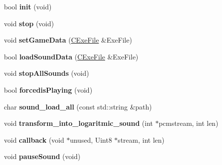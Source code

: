\begin{DoxyCompactItemize}
\item 
\hypertarget{class_c_sound_a369857e8cf384e176162fa31aa8e9bca}{
bool {\bfseries init} (void)}
\label{class_c_sound_a369857e8cf384e176162fa31aa8e9bca}

\item 
\hypertarget{class_c_sound_aed9247519d02d450fb96bf4e79b4dcc3}{
void {\bfseries stop} (void)}
\label{class_c_sound_aed9247519d02d450fb96bf4e79b4dcc3}

\item 
\hypertarget{class_c_sound_aa3cd2eaef3688d9ebc891db8075fbcc4}{
void {\bfseries setGameData} (\hyperlink{class_c_exe_file}{CExeFile} \&ExeFile)}
\label{class_c_sound_aa3cd2eaef3688d9ebc891db8075fbcc4}

\item 
\hypertarget{class_c_sound_a84130ee3c53309db4393845b75182708}{
bool {\bfseries loadSoundData} (\hyperlink{class_c_exe_file}{CExeFile} \&ExeFile)}
\label{class_c_sound_a84130ee3c53309db4393845b75182708}

\item 
\hypertarget{class_c_sound_a8ddf763f8ebfd19e2a95e2994a269e77}{
void {\bfseries stopAllSounds} (void)}
\label{class_c_sound_a8ddf763f8ebfd19e2a95e2994a269e77}

\item 
\hypertarget{class_c_sound_ab522837d2ed51dda2c0f23b5b6edab5d}{
bool {\bfseries forcedisPlaying} (void)}
\label{class_c_sound_ab522837d2ed51dda2c0f23b5b6edab5d}

\item 
\hypertarget{class_c_sound_a0b64e84be2c23f0a55e731fbb3cfd18d}{
char {\bfseries sound\_\-load\_\-all} (const std::string \&path)}
\label{class_c_sound_a0b64e84be2c23f0a55e731fbb3cfd18d}

\item 
\hypertarget{class_c_sound_a6a6877889d97341e408706f0af25f7e3}{
void {\bfseries transform\_\-into\_\-logaritmic\_\-sound} (int $\ast$pcmstream, int len)}
\label{class_c_sound_a6a6877889d97341e408706f0af25f7e3}

\item 
\hypertarget{class_c_sound_a88e03b84610908e12a5ce2ffbc86f83f}{
void {\bfseries callback} (void $\ast$unused, Uint8 $\ast$stream, int len)}
\label{class_c_sound_a88e03b84610908e12a5ce2ffbc86f83f}

\item 
\hypertarget{class_c_sound_a88be6f6109b1a40e114ed730bc43b8a9}{
void {\bfseries pauseSound} (void)}
\label{class_c_sound_a88be6f6109b1a40e114ed730bc43b8a9}


\end{DoxyCompactItemize}
